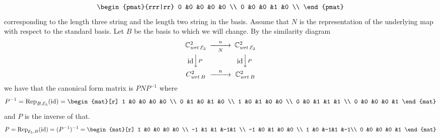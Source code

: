 \begin{exercises}
\begin{answer}
\begin{exparts}
\begin{equation*}
\begin{pmat}{rrr|rr}
              0  &0  &0  &0  &0  \\
              0  &0  &0  &1  &0  \\
            \end{pmat}
          \end{equation*}
          corresponding to the length three string and the length two
          string in the basis.
        \partsitem Assume that $N$ is the representation of the underlying
          map with respect to the standard basis.
          Let $B$ be the basis to which we will change. 
          By the similarity diagram
          \begin{equation*}
            \begin{CD}
              \C^2_{\wrt{\stdbasis_2}}      
                  @>n>N>        
                  \C^2_{\wrt{\stdbasis_2}}     \\
             @V\scriptstyle\identity V\scriptstyle PV  
                 @V\scriptstyle\identity V\scriptstyle PV \\
             C^2_{\wrt{B}}                 
                 @>n>>         
             \C^2_{\wrt{B}}
           \end{CD}
         \end{equation*}
         we have that the canonical form matrix is $PNP^{-1}$ where 
         \begin{equation*}
           P^{-1}
           =\rep{\identity}{B,\stdbasis_5}
           =\begin{mat}[r]
              1 &0 &0 &0 &0 \\              
              0 &1 &0 &1 &0 \\
              1 &0 &1 &0 &0 \\
              0 &0 &1 &1 &1 \\
              0 &0 &0 &0 &1
            \end{mat}
         \end{equation*}
         and $P$ is the inverse of that.
         \begin{equation*}
           P=\rep{\identity}{\stdbasis_5,B}
            =(P^{-1})^{-1}
           =\begin{mat}[r]
              1 &0 &0 &0 &0 \\              
             -1 &1 &1 &-1&1 \\
             -1 &0 &1 &0 &0 \\
              1 &0 &-1&1 &-1\\
              0 &0 &0 &0 &1
            \end{mat}

\end{equation*}
\end{exparts}
\end{answer}
\end{exercises}
